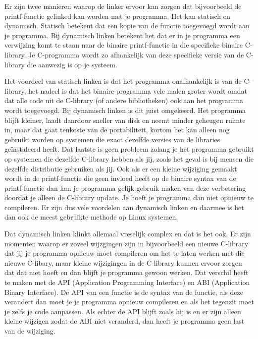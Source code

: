 Er zijn twee manieren waarop de linker ervoor kan zorgen dat bijvoorbeeld de printf-functie gelinked kan worden met je programma. Het
kan statisch en dynamisch. Statisch betekent dat een kopie van de functie toegevoegd wordt aan je programma. Bij dynamisch linken betekent het dat er in je programma een verwijzing
komt te staan naar de binaire printf-functie in die specifieke binaire C-library. Je C-programma wordt zo afhankelijk van deze specifieke
versie van de C-library die aanwezig is op je systeem.

Het voordeel van statisch linken is dat het programma onafhankelijk is van de C-library, het nadeel is dat het binaire-programma vele malen groter wordt omdat dat alle code uit de C-library (of andere bibliotheken) ook aan het programma wordt toegevoegd. Bij dynamisch linken is dit juist omgekeerd. Het programma blijft kleiner, laadt daardoor sneller van disk en neemt minder geheugen ruimte in, maar dat gaat tenkoste van de portabiliteit, kortom het kan alleen nog gebruikt worden op systemen die exact dezelfde versies van de libraries ge\"instaleerd heeft.
Dat laatste is geen probleem zolang je het programma gebruikt op
systemen die dezelfde C-library hebben als jij, zoals het geval is bij mensen die dezelfde distributie gebruiken als
jij. Ook als er een kleine wijziging gemaakt wordt in de printf-functie die geen invloed heeft op de binaire syntax van de printf-functie
dan kan je programma gelijk gebruik maken van deze verbetering doordat je alleen de C-library update. Je hoeft je
programma dan niet opnieuw te compileren. Er zijn dus vele voordelen aan dynamisch linken en daarmee is het dan ook de meest gebruikte methode op Linux systemen.

Dat dynamisch linken klinkt allemaal vreselijk complex en dat is het ook. Er zijn momenten waarop er zoveel wijzgingen zijn in bijvoorbeeld een nieuwe C-library dat jij je programma opnieuw moet compileren om het te laten werken met die nieuwe C-libary, maar kleine wijzigingen in de C-library kunnen ervoor zorgen dat dat niet hoeft en dan blijft je programma gewoon werken. Dat verschil heeft te maken met de API (Application Programming Interface) en ABI (Application Binary Interface). De API van een functie is de syntax van de functie, als deze
verandert dan moet je je programma opnieuw compileren en als het tegenzit moet je zelfs je code aanpassen. Als echter de API blijft zoals hij is en er zijn alleen kleine wijzigen zodat de ABI niet veranderd, dan heeft je programma geen last van de wijziging.\par

